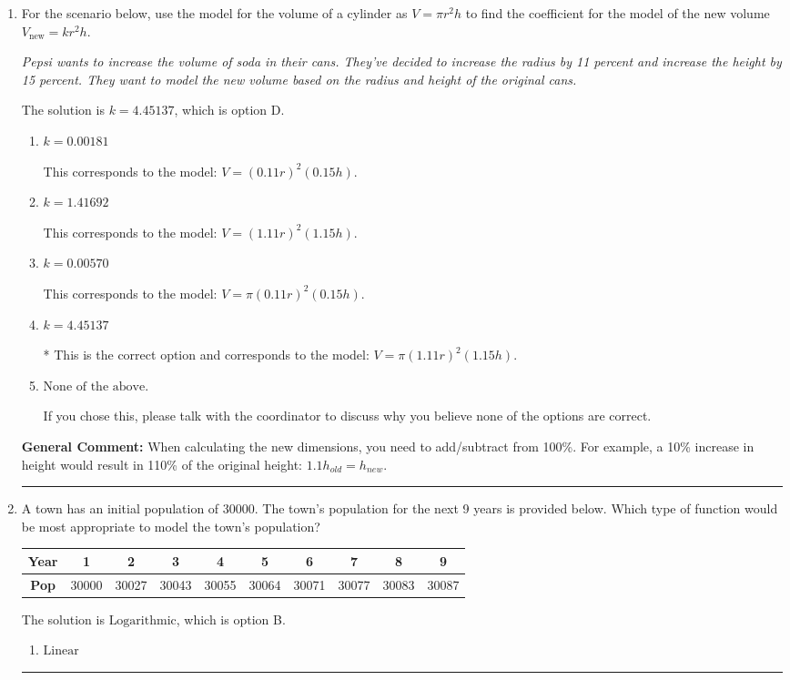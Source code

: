 \documentclass{extbook}[14pt]
\newcommand{\litem}[1]{\item #1

\rule{\textwidth}{0.4pt}}
\begin{document}
\begin{enumerate}\litem{
For the scenario below, use the model for the volume of a cylinder as $V = \pi r^2 h$ to find the coefficient for the model of the new volume $V_{\text{new}} = k r^2 h$.

\begin{center}
    \textit{ Pepsi wants to increase the volume of soda in their cans. They've decided to increase the radius by 11 percent and increase the height by 15 percent. They want to model the new volume based on the radius and height of the original cans. }
\end{center}
The solution is \( k = 4.45137 \), which is option D.\begin{enumerate}[label=\Alph*.]
\item \( k = 0.00181 \)

This corresponds to the model: $V = (0.11 r)^2 (0.15 h)$.
\item \( k = 1.41692 \)

This corresponds to the model: $V = (1.11 r)^2 (1.15 h)$.
\item \( k = 0.00570 \)

This corresponds to the model: $V = \pi (0.11 r)^2 (0.15 h)$.
\item \( k = 4.45137 \)

* This is the correct option and corresponds to the model: $V = \pi (1.11 r)^2 (1.15 h)$.
\item \( \text{None of the above.} \)

If you chose this, please talk with the coordinator to discuss why you believe none of the options are correct.
\end{enumerate}

\textbf{General Comment:} When calculating the new dimensions, you need to add/subtract from 100\%. For example, a 10\% increase in height would result in 110\% of the original height: $1.1h_{old} = h_{new}$.
}
\litem{
A town has an initial population of 30000. The town's population for the next 9 years is provided below. Which type of function would be most appropriate to model the town's population?


\begin{tabular}{c|c|c|c|c|c|c|c|c|c}
\textbf{Year} &1 &2 &3 &4 &5 &6 &7 &8 &9\tabularnewline \hline
\textbf{Pop} &30000 &30027 &30043 &30055 &30064 &30071 &30077 &30083 &30087\end{tabular}The solution is \( \text{Logarithmic} \), which is option B.\begin{enumerate}[label=\Alph*.]
\item \( \text{Linear} \)


\end{enumerate}}
\end{enumerate}
\end{document}
